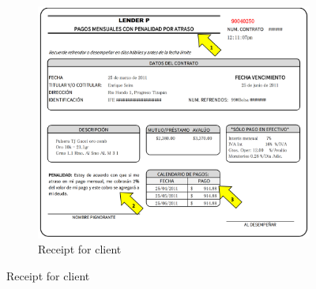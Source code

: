 \documentclass[oneside,11pt]{article}
\begin{document}
\begin{figure}[H]
     \caption{Contract Terms Summary, and Promise Slip}
    \label{PaperSlip}
    \begin{center}
    \begin{subfigure}{0.65\textwidth}
    \caption{Receipt for client}
        \centering
        \includegraphics[width=\textwidth]{Figuras/TicketLenderP.png}
    \end{subfigure}
    

\end{center}
\end{figure}
\end{document}
